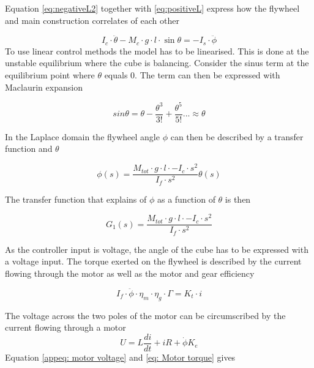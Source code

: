 \documentclass[a4paper,11pt]{kth-mag}
\begin{document}
Equation \ref{eq:negativeL2} together with \ref{eq:positiveL} express how the flywheel and main construction correlates of each other

\begin{equation}
I_c \cdot \ddot{\theta} - M_c \cdot g \cdot l \cdot \sin \theta   = -I_s \cdot \ddot{\phi}
\end{equation}
To use linear control methods the model has to be linearised. This is done at the unstable equilibrium where the cube is balancing. Consider the sinus term at the equilibrium point where $\theta$ equals $0$. The term can then be expressed with Maclaurin expansion

\begin{equation} \label{eq: sinus taylor}
sin \theta = \theta - \frac{\theta^3}{3!} +\frac{\theta^5}{5!}... \approx \theta 
\end{equation}

In the Laplace domain the flywheel angle $\phi$ can then be described by a transfer function and $\theta$

\begin{equation} \label{appeq: flywheelvscons}
\phi (s) = \frac{M_{tot} \cdot g \cdot l \cdot-I_c \cdot s^2}{I_f \cdot s^2}  \theta(s)
\end{equation}

The transfer function that explains of $\phi$ as a function of $\theta$ is then

\begin{equation} \label{appeq: transferfunc1}
G_1(s) = \frac{M_{tot} \cdot g \cdot l \cdot-I_c \cdot s^2}{I_f \cdot s^2} 
\end{equation}

As the controller input is voltage, the angle of the cube has to be expressed with a voltage input.
The torque exerted on the flywheel is described by the current flowing through the motor as well as the motor and gear efficiency

\begin{equation}\label{eq: Motor torque}
I_f \cdot \ddot{\phi} \cdot \eta_m \cdot \eta_g \cdot \Gamma  = K_t \cdot i
\end{equation}

The voltage across the two poles of the motor can be circumscribed by the current flowing through a motor
\begin{equation} \label{appeq: motor voltage}
U = L\frac{di}{dt} + iR + \dot{\phi}K_e
\end{equation}
Equation \ref{appeq: motor voltage} and \ref{eq: Motor torque} gives 
\end{document}
